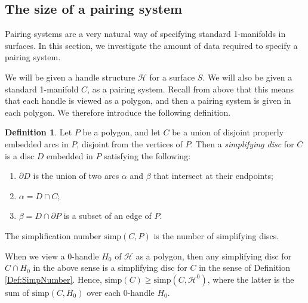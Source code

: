 \documentclass[oneside]{amsart}
\numberwithin{equation}{section}
\theoremstyle{plain}
\theoremstyle{definition}
\newtheorem{definition}[equation]{Definition}
\newcommand{\calH}{\mathcal{H}}
\begin{document}
\subsection{The size of a pairing system}
\label{SubSec:SizePairing}

Pairing systems are a very natural way of specifying standard 1-manifolds in surfaces.
In this section, we investigate the amount of data required to specify a pairing system.


We will be given a handle structure $\calH$ for a surface $S$. We will also be given a standard 1-manifold $C$, as a pairing system. Recall from above that this means that each handle is viewed as a polygon, and then a pairing system is given in each polygon. We therefore introduce the following definition.

\begin{definition}
Let $P$ be a polygon, and let $C$ be a union of disjoint properly embedded arcs in $P$, disjoint from the vertices of $P$. Then a \emph{simplifying disc} for $C$ is a disc $D$ embedded in $P$ satisfying the following:
\begin{enumerate}
\item $\partial D$ is the union of two arcs $\alpha$ and $\beta$ that intersect at their endpoints;
\item $\alpha = D \cap C$;
\item $\beta = D \cap \partial P$ is a subset of an edge of $P$.
\end{enumerate}
The simplification number $\mathrm{simp}(C,P)$ is the number of simplifying discs.
\end{definition}

When we view a 0-handle $H_0$ of $\calH$ as a polygon, then any simplifying disc for $C \cap H_0$ in the above sense is a simplifying disc for $C$ in the sense of Definition \ref{Def:SimpNumber}. Hence, $\mathrm{simp}(C) \geq \mathrm{simp}(C, \calH^0)$, where the latter is the sum of $\mathrm{simp}(C, H_0)$ over each 0-handle $H_0$.

\end{document}
